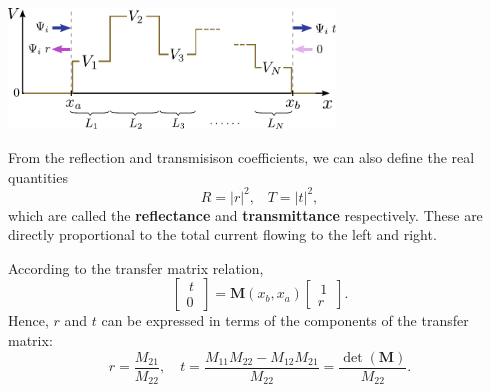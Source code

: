 \documentclass[pra,12pt]{revtex4}
\begin{document}
\begin{center}
  \includegraphics[width=0.65\textwidth]{transfer_matrix_setup3}
\end{center}

From the reflection and transmisison coefficients, we can also define
the real quantities
\begin{equation}
  R = |r|^2, \;\;\; T = |t|^2,
\end{equation}
which are called the \textbf{reflectance} and \textbf{transmittance}
respectively.  These are directly proportional to the total current
flowing to the left and right.

According to the transfer matrix relation,
\begin{equation}
  \begin{bmatrix}\,t\, \\ 0 \end{bmatrix} = \textbf{M}(x_b,x_a) \begin{bmatrix}\,1\, \\ r
\end{bmatrix}.
\end{equation}
Hence, $r$ and $t$ can be expressed in terms of the components of the
transfer matrix:
\begin{equation}
  r = \frac{M_{21}}{M_{22}}, \quad t = \frac{M_{11} M_{22} - M_{12}M_{21}}{M_{22}} = \frac{\det(\textbf{M})}{M_{22}}.
\end{equation}
\end{document}
